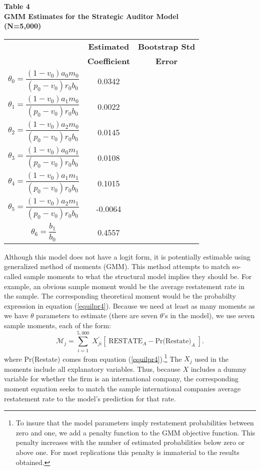 \documentclass[14pt]{article}
\newcommand\T{\rule[0em]{0pt}{1.5em}}       %
\newcommand\B{\rule[-1em]{0pt}{0pt}} %
\begin{document}
\begin{table}[t]
\begin{center}
{\bf Table 4} \\
{\bf GMM Estimates for the Strategic Auditor Model}\\ 
{\bf (N=5,000)} \\[1em]
\begin{tabular}{|c|cc|}
\hline
\T  &  {\bf Estimated}  & {\bf Bootstrap Std} \\ 
\B  & {\bf Coefficient} & {\bf Error} \\ \hline
\T $\theta_0= \dfrac{(1-v_0)a_0m_0}{(p_0-v_0)r_0b_0}$ & 0.0342 &\\[1.5em]
 $\theta_1=\dfrac{(1-v_0)a_1m_0}{(p_0-v_0)r_0b_0}$  &  0.0022 & \\[1.5em]
$\theta_2=\dfrac{(1-v_0)a_2m_0}{(p_0-v_0)r_0b_0}$  &  0.0145   & \\[1.5em]
$\theta_3=\dfrac{(1-v_0)a_0m_1}{(p_0-v_0)r_0b_0}$  &  0.0108  & \\[1.5em]
$\theta_4=\dfrac{(1-v_0)a_1m_1}{(p_0-v_0)r_0b_0}$ &  0.1015  &  \\[1.5em]
$\theta_5=\dfrac{(1-v_0)a_2m_1}{(p_0-v_0)r_0b_0}$ &  -0.0064  & \\[1.5em]
\B$\theta_6=\dfrac{b_1}{b_0}$ &  0.4557  & \\[1.6em]
\hline
\end{tabular}
\end{center}
\end{table}

Although this model does not have a logit form, it is potentially estimable using 
generalized method of moments (GMM). This method attempts to match so-called
sample moments to what the structural model implies they should be. For example,
an obvious sample moment would be the average restatement rate in the sample.
The corresponding theoretical moment would be the probabilty expression
in equation (\ref{equilpr4}). Because we need at least as many moments as
we have $\theta$ parameters to estimate (there are seven $\theta$'s in the model),
we use seven sample moments, each of the form:
$$ \mathcal{M}_j = \sum_{i=1}^{5,000} \; X_{ji}^\prime\left[\; \mbox{RESTATE}_A - \mbox{Pr(Restate)}_A \; \right]. $$
where Pr(Restate) comes from equation (\ref{equilpr4}).\footnote{To insure that the model parameters imply restatement probabilities
between zero and one, we add a penalty function to the GMM objective function.
This penalty increases with the number of estimated probabilities below zero or
above one. For most replications this penalty is immaterial to the results obtained.} The $X_j$ used in the moments include all explanatory variables. Thus, because $X$ includes  a dummy variable for whether the firm is an international company, the corresponding moment equation seeks to match the sample international companies average restatement rate to the model's prediction for that rate.
\end{document}
